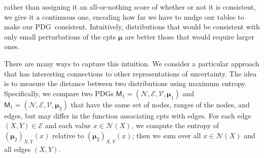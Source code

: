 \documentclass{article}
\newcommand{\bmu}{\boldsymbol{\mu}}
\newcommand{\V}{\mathcal V}
\newcommand{\N}{\mathcal N}
\newcommand{\Ed}{\mathcal E}
\newcommand{\sfM}{\mathsf M}
\newcommand{\MN}{PDG}
\numberwithin{equation}{section}
\begin{document}
	rather than assigning it an all-or-nothing score of whether or
        not it is consistent, we give it a continuous one, encoding
        how far we have to nudge our tables to make our
        \MN\ consistent. Intuitively, distributions that would be
        consistent with only small perturbations of the cpts $\bmu$
        are better those that would require larger ones.  
        
        There are many ways to capture this intuition.  We consider a
particular approach that has interesting connections to other
representations  of uncertainty.  The idea is to measure the distance
between two distributions using maximum entropy.  Specifically, we
compare two PDGs $\sfM_1 = (\N, \Ed, \V, \bmu_1)$ and $\sfM_1 = (\N,
\Ed, \V, \bmu_2)$ 
that have the same set of nodes, ranges of the nodes,
and edges, but may differ in the function associating cpts with
edges.  For each edge $(X,Y) \in \Ed$ and each value $x \in \N(X)$, we
compute the entropy of $(\bmu_2)_{X,Y}(x)$ relative to
$(\bmu_2)_{X,Y}(x)$; then we sum over all $x \in \N(X)$ and all edges
$(X,Y)$. 
\end{document}
